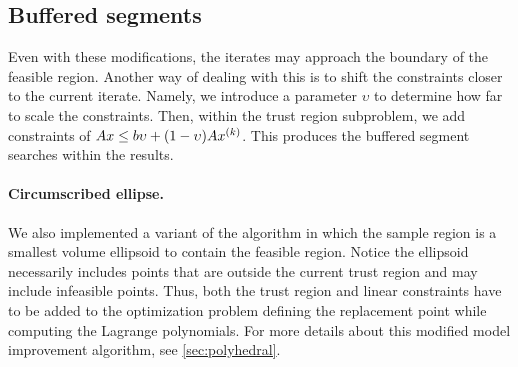 %



\subsection{Buffered segments}

Even with these modifications, the iterates may approach the boundary of the feasible region.
Another way of dealing with this is to shift the constraints closer to the current iterate.
Namely, we introduce a parameter $\upsilon$ to determine how far to scale the constraints.
Then, within the trust region subproblem, we add constraints of $Ax \le b\upsilon + (1-\upsilon) A x^{(k)} $.
This produces the buffered segment searches within the results.

\paragraph*{Circumscribed ellipse.}

We also implemented a variant of the algorithm in which the sample region is a smallest volume ellipsoid to contain the feasible region.
Notice the ellipsoid necessarily includes points that are outside the current trust region and may include infeasible points.
Thus, both the trust region and linear constraints have to be added to the optimization problem defining the replacement point while computing the Lagrange polynomials.
For more details about this modified model improvement algorithm, see \cref{sec:polyhedral}.

